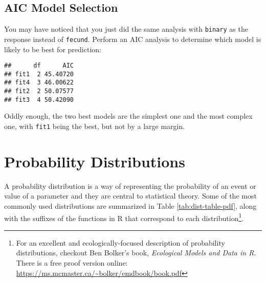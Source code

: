 \documentclass[]{book}
\newenvironment{Shaded}{\begin{snugshade}}{\end{snugshade}}
\newcommand{\KeywordTok}[1]{\textcolor[rgb]{0.13,0.29,0.53}{\textbf{#1}}}
\newcommand{\StringTok}[1]{\textcolor[rgb]{0.31,0.60,0.02}{#1}}
\newcommand{\OperatorTok}[1]{\textcolor[rgb]{0.81,0.36,0.00}{\textbf{#1}}}
\newcommand{\NormalTok}[1]{#1}
\let\rmarkdownfootnote\footnote%
\def\footnote{\protect\rmarkdownfootnote}
\theoremstyle{definition}
\theoremstyle{definition}
\theoremstyle{definition}
\theoremstyle{remark}
\begin{document}
\subsection{AIC Model Selection}\label{aic-model-selection-1}

You may have noticed that you just did the same analysis with
\texttt{binary} as the response instead of \texttt{fecund}. Perform an
AIC analysis to determine which model is likely to be best for
prediction:

\begin{Shaded}
\end{Shaded}

\begin{verbatim}
##      df      AIC
## fit1  2 45.40720
## fit4  3 46.00622
## fit2  2 50.07577
## fit3  4 50.42090
\end{verbatim}

Oddly enough, the two best models are the simplest one and the most
complex one, with \texttt{fit1} being the best, but not by a large
margin.

\section{Probability Distributions}\label{dists}

A probability distribution is a way of representing the probability of
an event or value of a parameter and they are central to statistical
theory. Some of the most commonly used distributions are summarized in
Table \ref{tab:dist-table-pdf}, along with the suffixes of the functions
in R that correspond to each distribution\footnote{For an excellent and
  ecologically-focused description of probability distributions,
  checkout Ben Bolker's book, \emph{Ecological Models and Data in R}.
  There is a free proof version online:
  \url{https://ms.mcmaster.ca/~bolker/emdbook/book.pdf}}.
\end{document}
